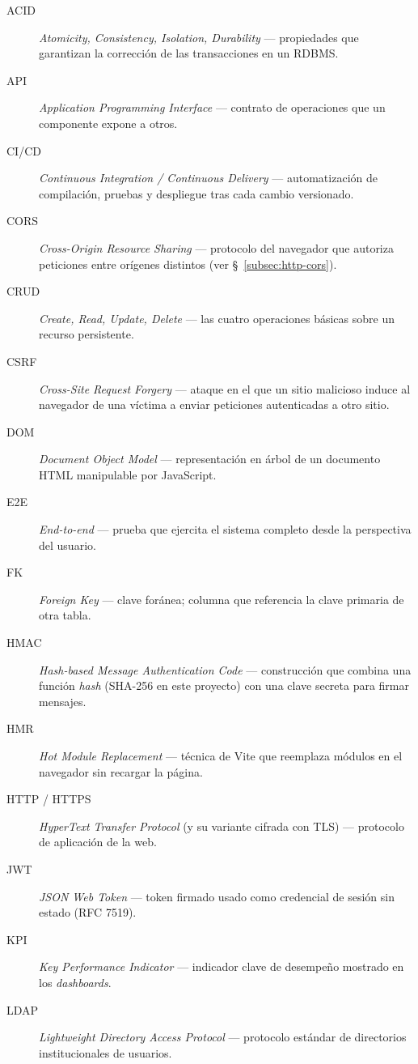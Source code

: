 \begin{description}
    \item[ACID] \emph{Atomicity, Consistency, Isolation, Durability} --- propiedades que garantizan la corrección de las transacciones en un RDBMS.
    \item[API] \emph{Application Programming Interface} --- contrato de operaciones que un componente expone a otros.
    \item[CI/CD] \emph{Continuous Integration / Continuous Delivery} --- automatización de compilación, pruebas y despliegue tras cada cambio versionado.
    \item[CORS] \emph{Cross-Origin Resource Sharing} --- protocolo del navegador que autoriza peticiones entre orígenes distintos (ver \S~\ref{subsec:http-cors}).
    \item[CRUD] \emph{Create, Read, Update, Delete} --- las cuatro operaciones básicas sobre un recurso persistente.
    \item[CSRF] \emph{Cross-Site Request Forgery} --- ataque en el que un sitio malicioso induce al navegador de una víctima a enviar peticiones autenticadas a otro sitio.
    \item[DOM] \emph{Document Object Model} --- representación en árbol de un documento HTML manipulable por JavaScript.
    \item[E2E] \emph{End-to-end} --- prueba que ejercita el sistema completo desde la perspectiva del usuario.
    \item[FK] \emph{Foreign Key} --- clave foránea; columna que referencia la clave primaria de otra tabla.
    \item[HMAC] \emph{Hash-based Message Authentication Code} --- construcción que combina una función \emph{hash} (SHA-256 en este proyecto) con una clave secreta para firmar mensajes.
    \item[HMR] \emph{Hot Module Replacement} --- técnica de Vite que reemplaza módulos en el navegador sin recargar la página.
    \item[HTTP / HTTPS] \emph{HyperText Transfer Protocol} (y su variante cifrada con TLS) --- protocolo de aplicación de la web.
    \item[JWT] \emph{JSON Web Token} --- token firmado usado como credencial de sesión sin estado (RFC 7519).
    \item[KPI] \emph{Key Performance Indicator} --- indicador clave de desempeño mostrado en los \emph{dashboards}.
    \item[LDAP] \emph{Lightweight Directory Access Protocol} --- protocolo estándar de directorios institucionales de usuarios.

\end{description}

